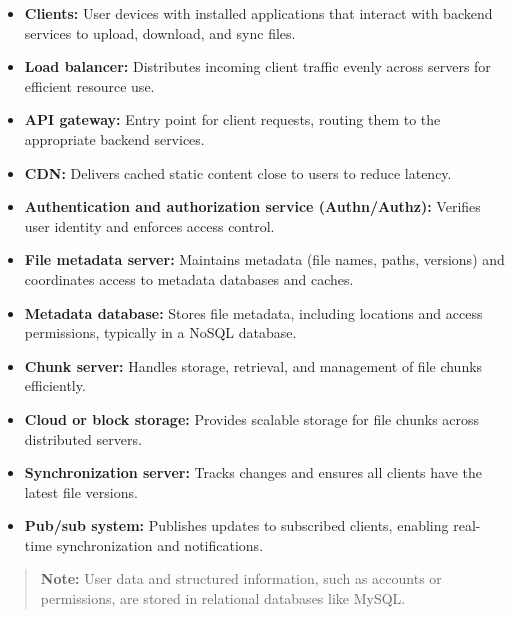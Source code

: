 \begin{itemize}
\item
\protect{}\label{DWReaR0APTK9nNf0EqY1J}
\textbf{Clients:} User devices with installed applications that interact with backend services to upload, download, and sync files.
\item
\protect{}\label{KnrSaz4ApjGtVQbZI-0BM}
\textbf{Load balancer:} Distributes incoming client traffic evenly across servers for efficient resource use.
\item
\protect{}\label{PWmsaLu8DjnWYVYc6Bigl}
\textbf{API gateway:} Entry point for client requests, routing them to the appropriate backend services.
\item
\protect{}\label{31FNRVTkMjfaU5LYkTrMX}
\textbf{CDN:} Delivers cached static content close to users to reduce latency.
\item
\protect{}\label{keyQHMObG1iA7NOJV-VDT}
\textbf{Authentication and authorization service (Authn/Authz):} Verifies user identity and enforces access control.
\item
\protect{}\label{QR6Rd9SXGk-vRa7rYUORC}
\textbf{File metadata server:} Maintains metadata (file names, paths, versions) and coordinates access to metadata databases and caches.
\item
\protect{}\label{EqjKxFxZDLOUDXplHze2o}
\textbf{Metadata database:} Stores file metadata, including locations and access permissions, typically in a NoSQL database.
\item
\protect{}\label{Waqt22gtKsdI7HOzswAtn}
\textbf{Chunk server:} Handles storage, retrieval, and management of file chunks efficiently.
\item
\protect{}\label{TikhLvSALn8Miosyrjfs2}
\textbf{Cloud or block storage:} Provides scalable storage for file chunks across distributed servers.
\item
\protect{}\label{eB-ffTbo6odhFteaY7wJ9}
\textbf{Synchronization server:} Tracks changes and ensures all clients have the latest file versions.
\item
\protect{}\label{H_iafs8jYguF7TkLpD3e7}
\textbf{Pub/sub system:} Publishes updates to subscribed clients, enabling real-time synchronization and notifications.
\end{itemize}
\begin{quote}
\textbf{Note:} User data and structured information, such as accounts or permissions, are stored in relational databases like MySQL.
\end{quote}
